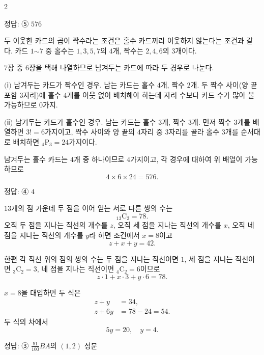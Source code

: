 \documentclass[10pt]{article}
\begin{document}
\begin{multicols}{2}
\begin{answerbox}정답: ⑤ $576$\end{answerbox}

두 이웃한 카드의 곱이 짝수라는 조건은 홀수 카드끼리 이웃하지 않는다는 조건과 같다. 카드 $1$$\sim$$7$ 중 홀수는 $1, 3, 5, 7$의 $4$개, 짝수는 $2, 4, 6$의 $3$개이다.

$7$장 중 $6$장을 택해 나열하므로 남겨두는 카드에 따라 두 경우로 나눈다.

$(\!$ⅰ$)$ 남겨두는 카드가 짝수인 경우. 남는 카드는 홀수 $4$개, 짝수 $2$개. 두 짝수 사이(양 끝 포함 $3$자리)에 홀수 $4$개를 이웃 없이 배치해야 하는데 자리 수보다 카드 수가 많아 불가능하므로 $0$가지.

$(\!$ⅱ$)$ 남겨두는 카드가 홀수인 경우. 남는 카드는 홀수 $3$개, 짝수 $3$개. 먼저 짝수 $3$개를 배열하면 $3! = 6$가지이고, 짝수 사이와 양 끝의 $4$자리 중 $3$자리를 골라 홀수 $3$개를 순서대로 배치하면 ${}_4\mathrm{P}_3 = 24$가지이다.

남겨두는 홀수 카드는 $4$개 중 하나이므로 $4$가지이고, 각 경우에 대하여 위 배열이 가능하므로
\[ 4 \times 6 \times 24 = 576. \]

\begin{answerbox}정답: ④ $4$\end{answerbox}

$13$개의 점 가운데 두 점을 이어 얻는 서로 다른 쌍의 수는
\[ {}_{13}\mathrm{C}_2 = 78. \]
오직 두 점을 지나는 직선의 개수를 $z$, 오직 세 점을 지나는 직선의 개수를 $x$, 오직 네 점을 지나는 직선의 개수를 $y$라 하면 조건에서 $x = 8$이고
\[ z + x + y = 42. \]

한편 각 직선 위의 점의 쌍의 수는 두 점을 지나는 직선이면 $1$, 세 점을 지나는 직선이면 ${}_3\mathrm{C}_2 = 3$, 네 점을 지나는 직선이면 ${}_4\mathrm{C}_2 = 6$이므로
\[ z \cdot 1 + x \cdot 3 + y \cdot 6 = 78. \]

$x = 8$을 대입하면 두 식은
\begin{align*}
z + y &= 34, \\
z + 6y &= 78 - 24 = 54.
\end{align*}
두 식의 차에서
\[ 5y = 20,\quad y = 4. \]

\begin{answerbox}정답: ③ $\tfrac{91}{100}BA$의 $(1,2)$ 성분\end{answerbox}


\end{multicols}
\end{document}
